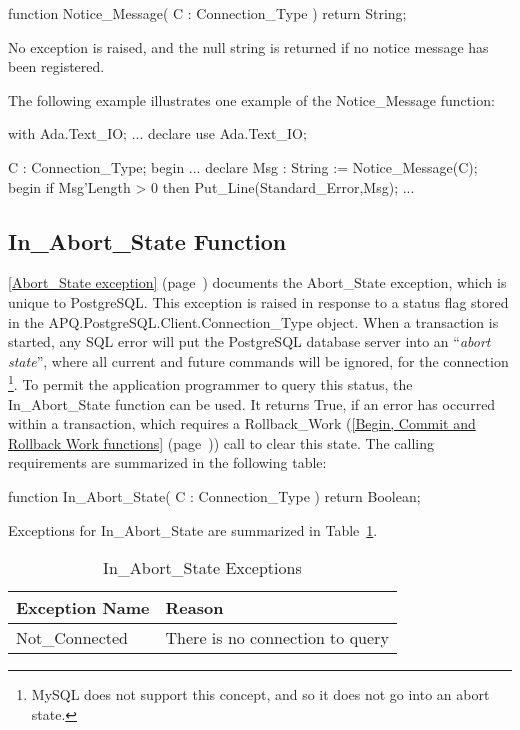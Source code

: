 \documentclass[english,letterpaper]{book}
\newcommand\Ref[1]{\textsection\ref{#1} (page~\pageref{#1})}
\begin{document}
\begin{Code}
function Notice_Message(
   C : Connection_Type
) return String;
\end{Code}

No exception is raised, and the null string is returned if no notice
message has been registered.

The following example illustrates one example of the Notice\_Message
function:

\begin{Example}
with Ada.Text_IO;
...
declare
   use Ada.Text_IO;

   C : Connection_Type;
begin
   ...
   declare
      Msg : String := Notice_Message(C);
   begin
      if Msg'Length > 0 then
         Put_Line(Standard_Error,Msg);
         ...
\end{Example}

\subsection{In\_Abort\_State Function\label{In_Abort_State Function}}

\Ref{Abort_State exception} documents the Abort\_State
exception, which is unique to PostgreSQL. This exception is raised in
response to a status flag stored in the
APQ\-.PostgreSQL\-.Client\-.Connection\_Type object. When a transaction is
started, any SQL error will put the PostgreSQL database server into an
``\emph{abort state}'', where all current and future commands will be
ignored, for the connection \footnote{MySQL does not support this
concept, and so it does not go into an abort state.}. To permit the
application programmer to query this status, the In\_Abort\_State
function can be used. It returns True, if an error has occurred within a
transaction, which requires a Rollback\_Work (\Ref{Begin, Commit and Rollback Work functions})
call to clear this state. The calling
requirements are summarized in the following table:

\begin{Code}
function In_Abort_State(
   C : Connection_Type
) return Boolean;
\end{Code}

Exceptions for In\_Abort\_State are summarized in Table~\ref{t:iasx}.

\begin{table}
   \begin{center}
      \begin{tabular}{ll}
         Exception Name    &  Reason\\
         \hline 
         Not\_Connected    &  There is no connection to query\\
      \end{tabular}
   \end{center}
   \caption{In\_Abort\_State Exceptions}\label{t:iasx}
\end{table}
\end{document}
